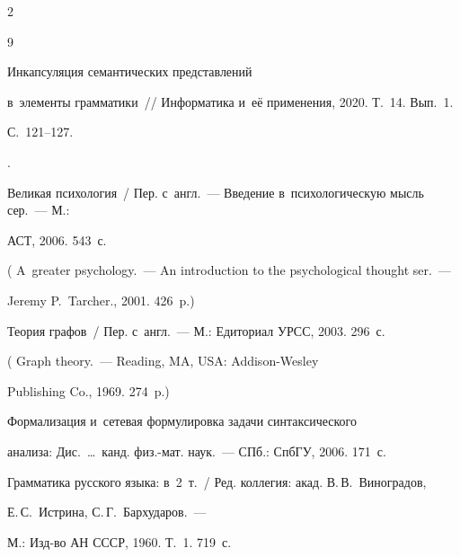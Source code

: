 \begin{multicols}{2}
{{\begin{thebibliography}{9}

 Инкапсуляция семантических пред\-став\-ле\-ний 

в~элементы грамматики~// Информатика и~её применения, 2020. Т.~14. Вып.~1.  

С.~121--127.


.

Великая психология~/ Пер. с~англ.~--- Введение в~психологическую мысль сер.~--- М.: 

АСТ, 2006. 543~с.

(  A~greater psychology.~--- An introduction to the psychological thought ser.~---

 Jeremy P.~Tarcher., 2001. 426~p.)


 Тео\-рия графов~/ Пер. с~англ.~--- М.: Едиториал УРСС, 2003. 296~с.

( {Graph theory}.~--- Reading, MA, USA: Addison-Wesley 

Publishing Co., 1969. 274~p.)


 Формализация и~сетевая формулировка задачи синтаксического 

анализа: Дис.\ \ldots\ канд. физ.-мат. наук.~--- СПб.: СпбГУ, 2006. 171~с.


Грамматика русского языка: в~2~т.~/ Ред. коллегия: акад. В.\,В.~Виноградов,

Е.\,С.~Истрина, С.\,Г.~Бархударов.~--- 

М.: Изд-во АН СССР, 1960. Т.~1. 719~с.





\end{thebibliography}



 }

 }



\end{multicols}



\vspace*{-6pt}



